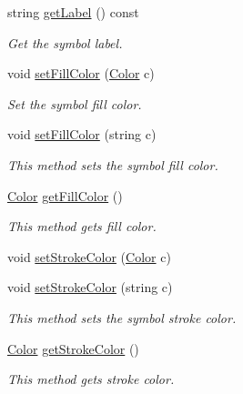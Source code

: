 \begin{DoxyCompactItemize}
string \hyperlink{classbridges_1_1datastructure_1_1_symbol_a549906b96da5d53b964844ca5f593b7f}{get\+Label} () const
\begin{DoxyCompactList}\small\item\em Get the symbol label. \end{DoxyCompactList}\item 
void \hyperlink{classbridges_1_1datastructure_1_1_symbol_a3019a17458fe5f0381cfd611338af6f7}{set\+Fill\+Color} (\hyperlink{classbridges_1_1datastructure_1_1_color}{Color} c)
\begin{DoxyCompactList}\small\item\em Set the symbol fill color. \end{DoxyCompactList}\item 
void \hyperlink{classbridges_1_1datastructure_1_1_symbol_ad7b92720fe76b59f1922fe25c967f442}{set\+Fill\+Color} (string c)
\begin{DoxyCompactList}\small\item\em This method sets the symbol fill color. \end{DoxyCompactList}\item 
\hyperlink{classbridges_1_1datastructure_1_1_color}{Color} \hyperlink{classbridges_1_1datastructure_1_1_symbol_a4b29601e24832077a15321af5c71cfdf}{get\+Fill\+Color} ()
\begin{DoxyCompactList}\small\item\em This method gets fill color. \end{DoxyCompactList}\item 
void \hyperlink{classbridges_1_1datastructure_1_1_symbol_ad98bc6de925ff8ee2274298e42617fc8}{set\+Stroke\+Color} (\hyperlink{classbridges_1_1datastructure_1_1_color}{Color} c)
\item 
void \hyperlink{classbridges_1_1datastructure_1_1_symbol_af5f15111c67cfd63d3b0b3dc70442d0c}{set\+Stroke\+Color} (string c)
\begin{DoxyCompactList}\small\item\em This method sets the symbol stroke color. \end{DoxyCompactList}\item 
\hyperlink{classbridges_1_1datastructure_1_1_color}{Color} \hyperlink{classbridges_1_1datastructure_1_1_symbol_aa99d36f97deaf99bee1d61778c85e87d}{get\+Stroke\+Color} ()
\begin{DoxyCompactList}\small\item\em This method gets stroke color. \end{DoxyCompactList}\item 

\end{DoxyCompactItemize}
